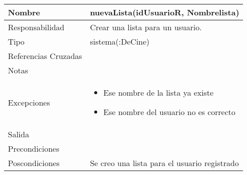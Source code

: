 \documentclass{article}
\begin{document}
\begin{table}[h]
\begin{tabular}{|l|l|l|l|l|l|}
\hline
\multicolumn{2}{|p{3cm}|}{Nombre} & \multicolumn{4}{p{10cm}|}{\textbf{nuevaLista(idUsuarioR, Nombrelista)}}\\
\hline
\multicolumn{2}{|p{3cm}|}{Responsabilidad} & \multicolumn{4}{p{10cm}|}{Crear una lista para un usuario.} \\
\hline
\multicolumn{2}{|p{3cm}|}{Tipo} & \multicolumn{4}{p{10cm}|}{sistema(:DeCine)} \\
\hline
\multicolumn{2}{|p{3cm}|}{Referencias Cruzadas} & \multicolumn{4}{p{10cm}|}{} \\
\hline
\multicolumn{2}{|p{3cm}|}{Notas} & \multicolumn{4}{p{10cm}|}{} \\
\hline
\multicolumn{2}{|p{3cm}|}{Excepciones} & \multicolumn{4}{p{10cm}|}{\begin{itemize}
\item Ese nombre de la lista ya existe 
\item Ese nombre del usuario no es correcto
\end{itemize}} \\
\hline
\multicolumn{2}{|p{3cm}|}{Salida} & \multicolumn{4}{p{10cm}|}{} \\
\hline
\multicolumn{2}{|p{3cm}|}{Precondiciones} & \multicolumn{4}{p{10cm}|}{} \\
\hline
\multicolumn{2}{|p{3cm}|}{Poscondiciones} & \multicolumn{4}{p{10cm}|}{Se creo una lista para el usuario registrado} \\
\hline
\end{tabular}
\end{table}
\end{document}
